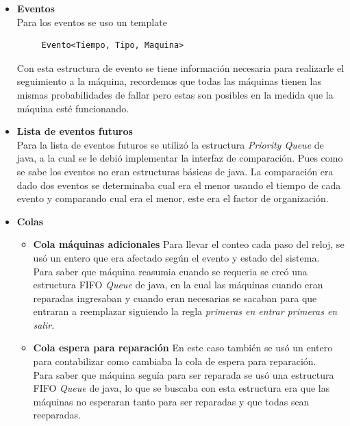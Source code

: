 \documentclass[12pt]{article}
\begin{document}
\begin{itemize}

	 \item \textbf{Eventos}\\
	 Para los eventos se uso un template 
	 \begin{verbatim}
	 Evento<Tiempo, Tipo, Maquina>
	 \end{verbatim}
	 Con esta estructura de evento se tiene información necesaria para realizarle el seguimiento a la máquina, recordemos que todas las m\'aquinas tienen las mismas probabilidades de fallar pero estas son posibles en la medida que la m\'aquina est\'e funcionando. 
	 
	 \item \textbf{Lista de eventos futuros}\\
	 Para la lista de eventos futuros se utilizó la estructura \emph{Priority Queue} de java, a la cual se le debi\'o implementar la interfaz de comparaci\'on. Pues como se sabe los eventos no eran estructuras b\'asicas de java. La comparaci\'on era dado dos eventos se determinaba cual era el menor usando el tiempo de cada evento y comparando cual era el menor, este era el factor de organizaci\'on. 
	 
 	 \item \textbf{Colas}\\
 	 \begin{itemize}
 	 \item \textbf{Cola máquinas adicionales}
 	 Para llevar el conteo cada paso del reloj, se usó un entero que era afectado según el evento y estado del sistema.\\
 	 Para saber que máquina reasumia cuando se requeria se creó una estructura FIFO \emph{Queue} de java, en la cual las máquinas cuando eran reparadas ingresaban y cuando eran necesarias se sacaban para que entraran a reemplazar siguiendo la regla \emph{primeras en entrar primeras en salir}.
 	 
 	 \item \textbf{Cola espera para reparación}
 	 En este caso tambi\'en se us\'o un entero para contabilizar como cambiaba la cola de espera para reparaci\'on. \\
 	 
 	 Para saber que m\'aquina segu\'ia para ser reparada se us\'o una estructura FIFO \emph{Queue} de java, lo que se buscaba con esta estructura era que las m\'aquinas no esperaran tanto para ser reparadas y que todas sean reeparadas.
 	 \end{itemize}
 	 

\end{itemize}
\end{document}
